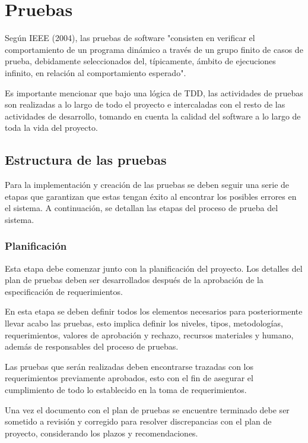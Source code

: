
\chapter{Pruebas}

Según IEEE (2004), las pruebas de software "consisten en verificar el comportamiento de un programa dinámico a través de un grupo finito de casos de prueba, debidamente seleccionados del, típicamente, ámbito de ejecuciones infinito, en relación al comportamiento esperado".

Es importante mencionar que bajo una lógica de TDD, las actividades de pruebas son realizadas a lo largo de todo el proyecto e intercaladas con el resto de las actividades de desarrollo, tomando en cuenta la calidad del software a lo largo de toda la vida del proyecto. 


\section{Estructura de las pruebas}

Para la implementación y creación de las pruebas se deben seguir una serie de etapas que garantizan que estas tengan éxito al encontrar los posibles errores en el sistema. A continuación, se detallan las etapas del proceso de prueba del sistema.

\subsection{Planificación}

Esta etapa debe comenzar junto con la planificación del proyecto. Los detalles del plan de pruebas deben ser desarrollados después de la aprobación de la especificación de requerimientos.

En esta etapa se deben definir todos los elementos necesarios para posteriormente llevar acabo las pruebas, esto implica definir los niveles, tipos, metodologías, requerimientos, valores de aprobación y rechazo, recursos materiales y humano, además de responsables del proceso de pruebas.

Las pruebas que serán realizadas deben encontrarse trazadas con los requerimientos previamente aprobados, esto con el fin de asegurar el cumplimiento de todo lo establecido en la toma de requerimientos.

Una vez el documento con el plan de pruebas se encuentre terminado debe ser sometido a revisión y corregido para resolver discrepancias con el plan de proyecto, considerando los plazos y recomendaciones.

